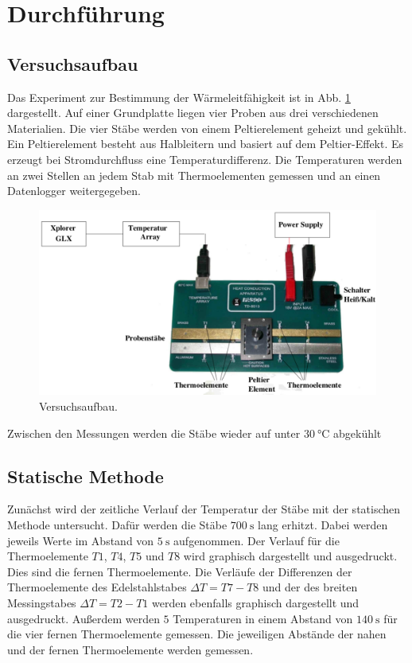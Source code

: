 \section{Durchführung}
\label{sec:Durchführung}

\subsection{Versuchsaufbau}
Das Experiment zur Bestimmung der Wärmeleitfähigkeit ist in Abb. \ref{fig:versuch} dargestellt. 
Auf einer Grundplatte liegen vier Proben aus drei verschiedenen Materialien. 
Die vier Stäbe werden von einem Peltierelement geheizt und gekühlt.
Ein Peltierelement besteht aus Halbleitern und basiert auf dem Peltier-Effekt.
Es erzeugt bei Stromdurchfluss eine Temperaturdifferenz.
Die Temperaturen werden an zwei Stellen an jedem Stab mit 
Thermoelementen gemessen und an einen Datenlogger weitergegeben.
\begin{figure}
    \centering
    \includegraphics[scale=0.2]{build/aufbau.png}
    \caption{Versuchsaufbau.}
    \label{fig:versuch}
\end{figure}

\noindent Zwischen den Messungen werden die Stäbe wieder auf unter $\SI{30}{\degreeCelsius}$ abgekühlt

\subsection{Statische Methode}
Zunächst wird der zeitliche Verlauf der Temperatur der Stäbe 
mit der statischen Methode untersucht.
Dafür werden die Stäbe $\SI{700}{\second}$ lang erhitzt.
Dabei werden jeweils Werte im Abstand von $\SI{5}{\second}$ aufgenommen.
Der Verlauf für die Thermoelemente
$T1$, $T4$, $T5$ und $T8$ wird graphisch dargestellt und ausgedruckt.
Dies sind die fernen Thermoelemente.
Die Verläufe der Differenzen der Thermoelemente des Edelstahlstabes $\Delta T = T7 - T8$
und der des breiten Messingstabes $\Delta T = T2 - T1$ werden ebenfalls graphisch dargestellt und
ausgedruckt.
Außerdem werden $\num{5}$ Temperaturen in einem Abstand von $\SI{140}{\second}$
für die vier fernen Thermoelemente gemessen.
Die jeweiligen Abstände der nahen und der fernen Thermoelemente werden gemessen.

